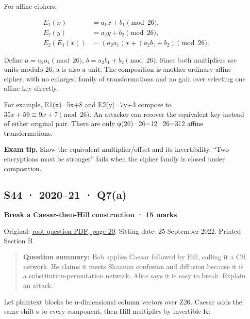 \documentclass[11pt,a4paper]{article}
\begin{document}
For affine ciphers:



\[
\begin{aligned}E_1(x)&=a_1x+b_1\pmod{26},\\E_2(y)&=a_2y+b_2\pmod{26},\\E_2(E_1(x))&=(a_2a_1)x+(a_2b_1+b_2)\pmod{26}.\end{aligned}
\]

Define \(a=a_2a_1\pmod{26}\),\allowbreak{} \(b=a_2b_1+b_2\pmod{26}\). Since both multipliers are units modulo 26,\allowbreak{} a is also a unit. The composition is another ordinary affine cipher,\allowbreak{} with no enlarged family of transformations and no gain over selecting one affine key directly.


For example,\allowbreak{} E1(x)=\allowbreak{}5x+8 and E2(y)=\allowbreak{}7y+3 compose to \(35x+59\equiv9x+7\pmod{26}\). An attacker can recover the equivalent key instead of either original pair. There are only φ(26)·26=\allowbreak{}12·26=\allowbreak{}312 affine transformations.



{\color{ForestGreen}\textbf{Exam tip.} Show the equivalent multiplier/\allowbreak{}offset and its invertibility. “Two encryptions must be stronger” fails when the cipher family is closed under composition.}




\clearpage
\subsection{S44 · 2020–21 · Q7(a)}\label{s44}

\textbf{Break a Caesar-then-Hill construction · 15 marks}


Original: \href{../../CSE405-Security_Merged.pdf\#page=20}{root question PDF,\allowbreak{} page 20}. Sitting date: 25 September 2022. Printed Section B.



\begin{quote}\small

\textbf{Question summary:} Bob applies Caesar followed by Hill,\allowbreak{} calling it a CH network. He claims it meets Shannon confusion and diffusion because it is a substitution-permutation network. Alice says it is easy to break. Explain an attack.



\end{quote}

Let plaintext blocks be n-dimensional column vectors over Z26. Caesar adds the same shift s to every component,\allowbreak{} then Hill multiplies by invertible K:
\end{document}
